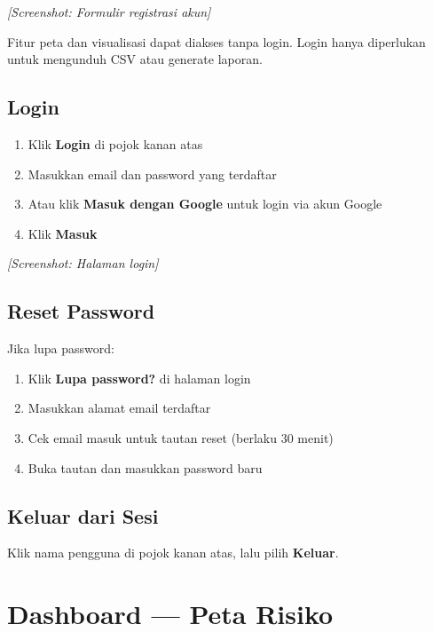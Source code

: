 \documentclass[12pt, a4paper]{article}
\newcommand{\screenshot}[1]{%
    \begin{center}
      \begin{tcolorbox}[
        enhanced,
        colback  = sectiongray,
        colframe = padisborder,
        arc      = 6pt,
        boxrule  = 0.6pt,
        height   = 5.5cm,
        valign   = center,
        halign   = center,
        fontupper = \sffamily\small\color{padismuted},
      ]
        \textit{[Screenshot: #1]}
      \end{tcolorbox}
    \end{center}%
  }
\begin{document}
  \screenshot{Formulir registrasi akun}

  \begin{notebox}
    Fitur peta dan visualisasi dapat diakses tanpa login. Login hanya diperlukan untuk
    mengunduh CSV atau generate laporan.
  \end{notebox}

  \subsection{Login}

  \begin{enumerate}
    \item Klik \textbf{Login} di pojok kanan atas
    \item Masukkan email dan password yang terdaftar
    \item Atau klik \textbf{Masuk dengan Google} untuk login via akun Google
    \item Klik \textbf{Masuk}
  \end{enumerate}

  \screenshot{Halaman login}

  \subsection{Reset Password}

  Jika lupa password:
  \begin{enumerate}
    \item Klik \textbf{Lupa password?} di halaman login
    \item Masukkan alamat email terdaftar
    \item Cek email masuk untuk tautan reset (berlaku 30 menit)
    \item Buka tautan dan masukkan password baru
  \end{enumerate}

  \subsection{Keluar dari Sesi}

  Klik nama pengguna di pojok kanan atas, lalu pilih \textbf{Keluar}.

  \newpage

  \section{Dashboard — Peta Risiko}
\end{document}
